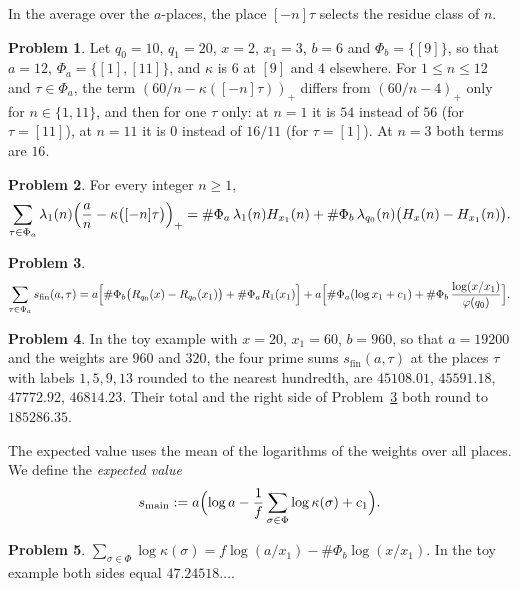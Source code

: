 \documentclass[reqno]{amsart}
\theoremstyle{definition}
\newtheorem{problem}{Problem}[section]
\theoremstyle{plain}
\newcommand{\smain}{s_{\mathrm{main}}}
\begin{document}
In the average over the \(a\)-places, the place \([-n]\tau\) selects the residue class of \(n\).

\begin{problem}\label{pr:select}
Let \(q_0 = 10\), \(q_1 = 20\), \(x = 2\), \(x_1 = 3\), \(b = 6\) and \(\Phi_b = \{[9]\}\), so that \(a = 12\), \(\Phi_a = \{[1], [11]\}\), and \(\kappa\) is \(6\) at \([9]\) and \(4\) elsewhere.  For \(1 \le n \le 12\) and \(\tau \in \Phi_a\), the term \((60/n - \kappa([-n]\tau))_+\) differs from \((60/n - 4)_+\) only for \(n \in \{1, 11\}\), and then for one \(\tau\) only: at \(n = 1\) it is \(54\) instead of \(56\) (for \(\tau = [11]\)), at \(n = 11\) it is \(0\) instead of \(16/11\) (for \(\tau = [1]\)).  At \(n = 3\) both terms are \(16\).
\end{problem}

\begin{problem}\label{pr:thick-avg}
For every integer \(n \ge 1\),
\[
  \sum_{\tau \in \Phi_a} \lambda_1(n) \Bigl( \frac an - \kappa\bigl([-n]\tau\bigr) \Bigr)_+
  = \#\Phi_a\, \lambda_1(n) H_{x_1}(n) + \#\Phi_b\, \lambda_{q_0}(n) \bigl( H_x(n) - H_{x_1}(n) \bigr) .
\]
\end{problem}

\begin{problem}\label{pr:sum-A}
\[
  \sum_{\tau \in \Phi_a} s_{\mathrm{fin}}(a, \tau)
  = a \Bigl[ \#\Phi_b \bigl( R_{q_0}(x) - R_{q_0}(x_1) \bigr) + \#\Phi_a R_1(x_1) \Bigr]
  + a \Bigl[ \#\Phi_a (\log x_1 + c_1) + \#\Phi_b\, \frac{\log (x/x_1)}{\varphi(q_0)} \Bigr] .
\]
\end{problem}

\begin{problem}\label{pr:toy-sum}
In the toy example with \(x = 20\), \(x_1 = 60\), \(b = 960\), so that \(a = 19200\) and the weights are \(960\) and \(320\), the four prime sums \(s_{\mathrm{fin}}(a, \tau)\) at the places \(\tau\) with labels \(1, 5, 9, 13\) rounded to the nearest hundredth, are \(45108.01\), \(45591.18\), \(47772.92\), \(46814.23\).  Their total and the right side of Problem~\ref{pr:sum-A} both round to \(185286.35\).
\end{problem}

The expected value uses the mean of the logarithms of the weights over all places.  We define the \emph{expected value}
\[
  \smain := a \Bigl( \log a - \frac1f \sum_{\sigma \in \Phi} \log \kappa(\sigma) + c_1 \Bigr) .
\]

\begin{problem}\label{pr:log-mean}
\(\sum_{\sigma \in \Phi} \log \kappa(\sigma) = f \log (a/x_1) - \#\Phi_b \log (x/x_1)\).  In the toy example both sides equal \(47.24518\ldots\).
\end{problem}
\end{document}
